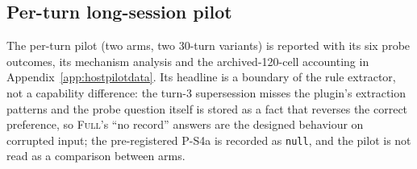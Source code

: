 \subsection{Per-turn long-session pilot}\label{sec:exp:s4}

The per-turn pilot (two arms, two 30-turn variants) is reported with its six probe
outcomes, its mechanism analysis and the archived-120-cell accounting in
Appendix~\ref{app:hostpilotdata}. Its headline is a boundary of the rule
extractor, not a capability difference: the turn-3 supersession misses the
plugin's extraction patterns and the probe question itself is stored as a fact
that reverses the correct preference, so \textsc{Full}'s ``no record'' answers are
the designed behaviour on corrupted input; the pre-registered P-S4a is recorded as
\texttt{null}, and the pilot is not read as a comparison between arms.
